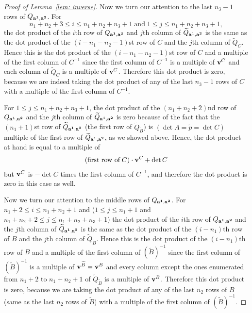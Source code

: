 \documentclass[10pt,a4paper]{amsart}
\begin{document}
\begin{proof} [Proof of Lemma~\ref{lem: inverse}]
Now we turn our attention to the last $n_3-1$  rows of $Q_{{\bf a^1}, {\bf a^2}}$. For $$n_1+n_2+3 \leq i \leq n_1+n_2+n_3+1\; \mbox{and}\; 1 \leq j \leq n_1+n_2+n_3+1,$$ the dot product of the $i$th row of $Q_{{\bf a^1}, {\bf a^2}}$ and $j$th  column of $\widetilde{Q}_{{\bf a^1}, {\bf a^2}}$ is the same as the dot product of the $(i-n_1-n_2-1)$st  row of $C$ and the  $j$th  column of $\widetilde{Q}_C$. Hence this is the dot product of the $(i-n_1-n_2-1)$st row of $C$ and a multiple of the first column of $C^{-1}$ since the first column of $C^{-1}$ is a multiple of ${\bf v}^C$ and  each column of  $\widetilde{Q}_C$ is a multiple of ${\bf v}^C$.  Therefore this dot product is zero,  because we are indeed taking the dot product of any of the last  $n_3-1$ rows of $C$ with a multiple of the first column of $C^{-1}$. 

For  $1 \leq j \leq n_1+n_2+n_3+1$, the dot product of the $(n_1+n_2+2)$nd row of $Q_{{\bf a^1}, {\bf a^2}}$ and the $j$th  column of $\widetilde{Q}_{{\bf a^1}, {\bf a^2}}$ is zero because of the fact that the $(n_1+1)$st row of  $\widetilde{Q}_{{\bf a^1}, {\bf a^2}}$ (the first row of $\widetilde{Q}_{\widetilde{B}}$) is $(\det A =\widetilde{p}=\det C)$ multiple of the first row of $\widetilde{Q}_{{\bf a^1}, {\bf a^2}}$, as we showed above.   Hence, the dot product at hand is equal to a multiple of $$(\mbox{first row of}\; C) \cdot {\bf v}^C + \det C$$ but ${\bf v}^C$ is $-\det C$ times the first column of $C^{-1}$, and therefore the dot product is zero in this case as well. 

Now we turn our attention to the middle rows of  $Q_{{\bf a^1}, {\bf a^2}}$. For $n_1+2 \leq i \leq n_1+n_2+1$ and ($1 \leq j \leq n_1+1$ and $n_1+n_2+2 \leq j \leq n_1+n_2+n_3+1$) the dot product of the $i$th row of $Q_{{\bf a^1}, {\bf a^2}}$ and the $j$th  column of $\widetilde{Q}_{{\bf a^1}, {\bf a^2}}$ is the same as the dot product of the $(i-n_1)$th row of $B$ and the  $j$th  column of  $\widetilde{Q}_{\widetilde{B}}$. Hence this is the dot product of the $(i-n_1)$th row of $B$ and a multiple of the first column of $(\widetilde{B})^{-1}$ since the first column of $(\widetilde{B})^{-1}$ is a multiple of ${\bf v}^{\widetilde{B}}={\bf v}^B$ and every column except the ones enumerated from $n_1+2$ to $n_1+n_2+1$ of  $\widetilde{Q}_{\widetilde{B}}$ is a multiple of ${\bf v}^B$. Therefore this dot product is zero, because we are taking the dot product of any of the last $n_2$ rows of $B$ (same as the last $n_2$ rows of  $\widetilde{B}$) with a multiple of the first column of $(\widetilde{B})^{-1}$. 


\end{proof}
\end{document}
